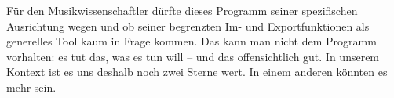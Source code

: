 Für den Musikwissenschaftler dürfte dieses Programm seiner spezifischen
Ausrichtung wegen und ob seiner begrenzten Im- und Exportfunktionen als generelles
Tool kaum in Frage kommen. Das kann man nicht dem Programm vorhalten: es
tut das, was es tun will -- und das offensichtlich gut. In unserem Kontext ist
es uns deshalb noch zwei Sterne wert. In einem anderen könnten es mehr sein.

% 
